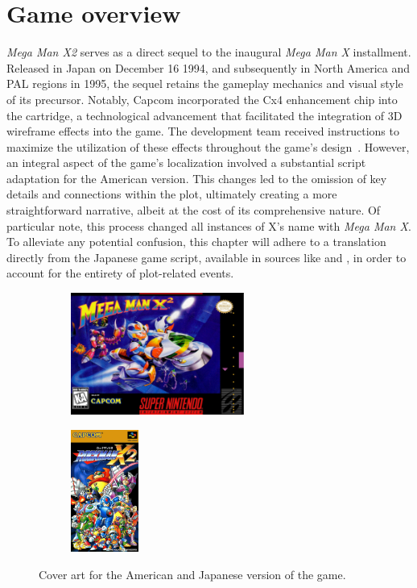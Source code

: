 \chapter{Game overview}
\textit{Mega Man X2} serves as a direct sequel to the inaugural \textit{Mega Man X} installment. Released in Japan on December 16 1994, and subsequently in North America and PAL regions in 1995, the sequel retains the gameplay mechanics and visual style of its precursor. Notably, Capcom incorporated the Cx4 enhancement chip into the cartridge, a technological advancement that facilitated the integration of 3D wireframe effects into the game. The development team received instructions to maximize the utilization of these effects throughout the game's design~\cite{wiki:MMX2}. However, an integral aspect of the game's localization involved a substantial script adaptation for the American version. This changes led to the omission of key details and connections within the plot, ultimately creating a more straightforward narrative, albeit at the cost of its comprehensive nature. Of particular note, this process changed all instances of X's name with \textit{Mega Man X}. To alleviate any potential confusion, this chapter will adhere to a translation directly from the Japanese game script, available in sources like \cite{wordpress:X2_japanese_script} and \cite{gamesfaq:X2_japanese_script}, in order to account for the entirety of plot-related events.

\begin{figure}[htp]
	\centering
	\begin{subfigure}[c]{0.5\linewidth}
		\centering
		\includegraphics[height=4cm]{figures/X2/Mega_Man_X2_Box_Art.png}
	\end{subfigure}
	\begin{subfigure}[c]{0.3\linewidth}
		\centering
		\includegraphics[height=4cm]{figures/X2/Rockman_X2_Box_Art.png}
	\end{subfigure}
	\caption{Cover art for the American and Japanese version of the game.}
\end{figure}


